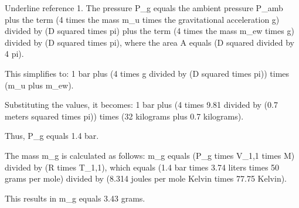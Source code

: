 Underline reference 1. The pressure P_g equals the ambient pressure P_amb plus the term (4 times the mass m_u times the gravitational acceleration g) divided by (D squared times pi) plus the term (4 times the mass m_ew times g) divided by (D squared times pi), where the area A equals (D squared divided by 4 pi).

This simplifies to:
1 bar plus (4 times g divided by (D squared times pi)) times (m_u plus m_ew).

Substituting the values, it becomes:
1 bar plus (4 times 9.81 divided by (0.7 meters squared times pi)) times (32 kilograms plus 0.7 kilograms).

Thus, P_g equals 1.4 bar.

The mass m_g is calculated as follows:
m_g equals (P_g times V_1,1 times M) divided by (R times T_1,1), which equals (1.4 bar times 3.74 liters times 50 grams per mole) divided by (8.314 joules per mole Kelvin times 77.75 Kelvin).

This results in m_g equals 3.43 grams.